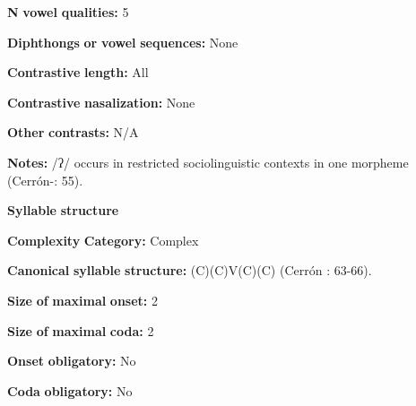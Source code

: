 \begin{styleBody}
\textbf{N} \textbf{vowel} \textbf{qualities:} 5
\end{styleBody}

\begin{styleBody}
\textbf{Diphthongs} \textbf{or} \textbf{vowel} \textbf{sequences:} None
\end{styleBody}

\begin{styleBody}
\textbf{Contrastive} \textbf{length:} All
\end{styleBody}

\begin{styleBody}
\textbf{Contrastive} \textbf{nasalization:} None
\end{styleBody}

\begin{styleBody}
\textbf{Other} \textbf{contrasts:} N/A
\end{styleBody}

\begin{styleBody}
\textbf{Notes:} /ʔ/ occurs in restricted sociolinguistic contexts in one morpheme (Cerrón-\citealt{Palomino2006}: 55).
\end{styleBody}

\begin{styleBody}
\textbf{Syllable} \textbf{structure}
\end{styleBody}

\begin{styleBody}
\textbf{Complexity} \textbf{Category:} Complex
\end{styleBody}

\begin{styleBody}
\textbf{Canonical} \textbf{syllable} \textbf{structure:} (C)(C)V(C)(C) (Cerrón \citealt{Palomino2006}: 63-66).
\end{styleBody}

\begin{styleBody}
\textbf{Size} \textbf{of} \textbf{maximal} \textbf{onset:} 2
\end{styleBody}

\begin{styleBody}
\textbf{Size} \textbf{of} \textbf{maximal} \textbf{coda:} 2
\end{styleBody}

\begin{styleBody}
\textbf{Onset} \textbf{obligatory:} No
\end{styleBody}

\begin{styleBody}
\textbf{Coda} \textbf{obligatory:} No
\end{styleBody}

